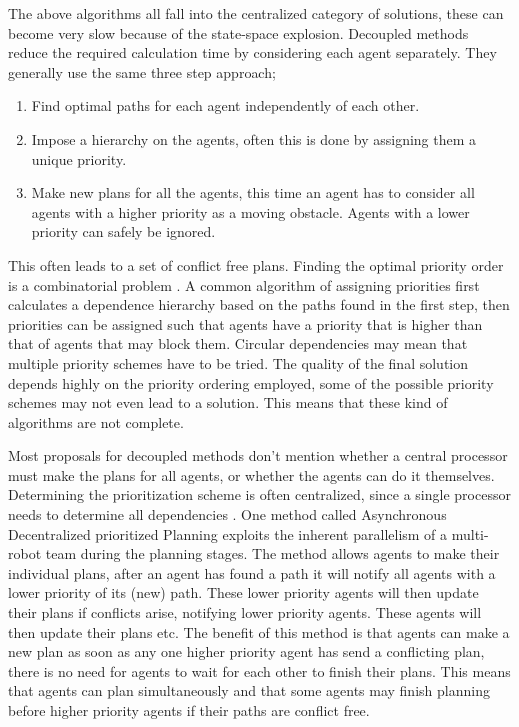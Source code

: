 The above algorithms all fall into the centralized category of solutions, these
can become very slow because of the state-space explosion. Decoupled methods
reduce the required calculation time by considering each agent separately. They
generally use the same three step approach;
\begin{enumerate}
    \item Find optimal paths for each agent independently of each other.
    \item Impose a hierarchy on the agents, often this is done by assigning
    them a unique priority.
    \item Make new plans for all the agents, this time an agent has to consider
    all agents with a higher priority as a moving obstacle. Agents with a lower
    priority can safely be ignored.
\end{enumerate}
This often leads to a set of conflict free plans. Finding the optimal priority
order is a combinatorial problem \cite{bennewitz2002}. A common algorithm of
assigning priorities first calculates a dependence hierarchy based on the paths
found in the first step, then priorities can be assigned such that agents have
a priority that is higher than that of agents that may block them. Circular
dependencies may mean that multiple priority schemes have to be tried. The
quality of the final solution depends highly on the priority ordering employed,
some of the possible priority schemes may not even lead to a solution. This
means that these kind of algorithms are not complete.

Most proposals for decoupled methods don't mention whether a central processor
must make the plans for all agents, or whether the agents can do it themselves.
Determining the prioritization scheme is often centralized, since a
single processor needs to determine all dependencies \cite{bennewitz2002}. One
method called Asynchronous Decentralized prioritized Planning \cite{cap2012}
exploits the inherent parallelism of a multi-robot team during the planning
stages. The method allows
agents to make their individual plans, after an agent has found a path it will
notify all agents with a lower priority of its (new) path. These lower priority
agents will then update their plans if conflicts arise, notifying lower
priority agents. These agents will then update their plans etc. The benefit of
this method is that agents can make a new plan as soon as any one higher
priority agent has send a conflicting plan, there is no need for agents to
wait for each other to finish their plans. This means that agents can plan
simultaneously and that some agents may finish planning before higher priority
agents if their paths are conflict free.

